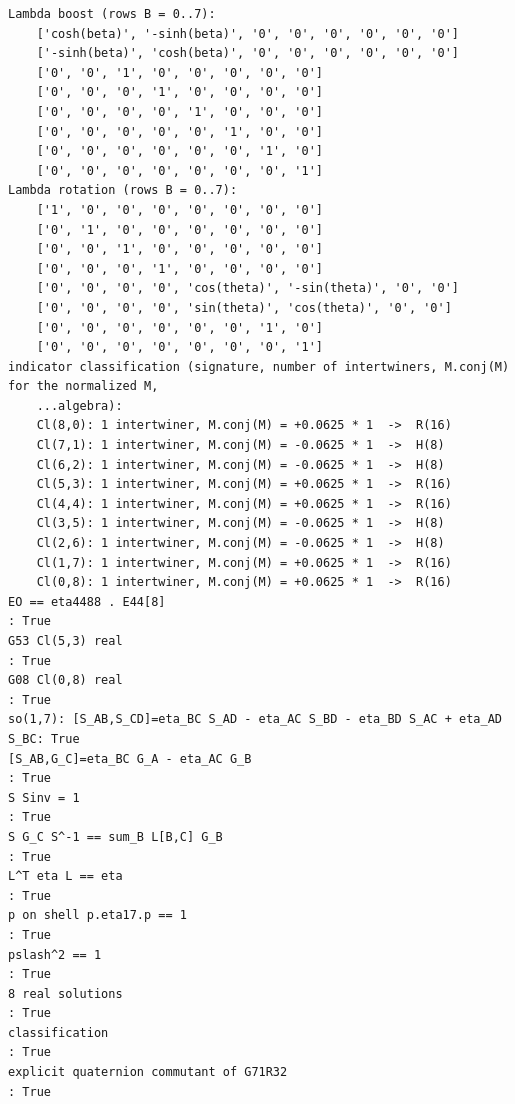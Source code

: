 \documentclass[10pt,a4paper]{article}
\begin{document}
\begin{Verbatim}[fontsize=\small,frame=single,framesep=2mm]
Lambda boost (rows B = 0..7):
    ['cosh(beta)', '-sinh(beta)', '0', '0', '0', '0', '0', '0']
    ['-sinh(beta)', 'cosh(beta)', '0', '0', '0', '0', '0', '0']
    ['0', '0', '1', '0', '0', '0', '0', '0']
    ['0', '0', '0', '1', '0', '0', '0', '0']
    ['0', '0', '0', '0', '1', '0', '0', '0']
    ['0', '0', '0', '0', '0', '1', '0', '0']
    ['0', '0', '0', '0', '0', '0', '1', '0']
    ['0', '0', '0', '0', '0', '0', '0', '1']
Lambda rotation (rows B = 0..7):
    ['1', '0', '0', '0', '0', '0', '0', '0']
    ['0', '1', '0', '0', '0', '0', '0', '0']
    ['0', '0', '1', '0', '0', '0', '0', '0']
    ['0', '0', '0', '1', '0', '0', '0', '0']
    ['0', '0', '0', '0', 'cos(theta)', '-sin(theta)', '0', '0']
    ['0', '0', '0', '0', 'sin(theta)', 'cos(theta)', '0', '0']
    ['0', '0', '0', '0', '0', '0', '1', '0']
    ['0', '0', '0', '0', '0', '0', '0', '1']
indicator classification (signature, number of intertwiners, M.conj(M) for the normalized M,
    ...algebra):
    Cl(8,0): 1 intertwiner, M.conj(M) = +0.0625 * 1  ->  R(16)
    Cl(7,1): 1 intertwiner, M.conj(M) = -0.0625 * 1  ->  H(8)
    Cl(6,2): 1 intertwiner, M.conj(M) = -0.0625 * 1  ->  H(8)
    Cl(5,3): 1 intertwiner, M.conj(M) = +0.0625 * 1  ->  R(16)
    Cl(4,4): 1 intertwiner, M.conj(M) = +0.0625 * 1  ->  R(16)
    Cl(3,5): 1 intertwiner, M.conj(M) = -0.0625 * 1  ->  H(8)
    Cl(2,6): 1 intertwiner, M.conj(M) = -0.0625 * 1  ->  H(8)
    Cl(1,7): 1 intertwiner, M.conj(M) = +0.0625 * 1  ->  R(16)
    Cl(0,8): 1 intertwiner, M.conj(M) = +0.0625 * 1  ->  R(16)
EO == eta4488 . E44[8]                                                : True
G53 Cl(5,3) real                                                      : True
G08 Cl(0,8) real                                                      : True
so(1,7): [S_AB,S_CD]=eta_BC S_AD - eta_AC S_BD - eta_BD S_AC + eta_AD S_BC: True
[S_AB,G_C]=eta_BC G_A - eta_AC G_B                                    : True
S Sinv = 1                                                            : True
S G_C S^-1 == sum_B L[B,C] G_B                                        : True
L^T eta L == eta                                                      : True
p on shell p.eta17.p == 1                                             : True
pslash^2 == 1                                                         : True
8 real solutions                                                      : True
classification                                                        : True
explicit quaternion commutant of G71R32                               : True

\end{Verbatim}
\end{document}
